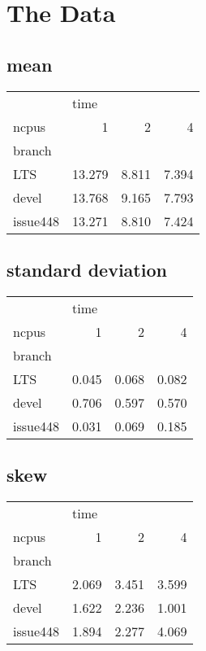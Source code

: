 \chapter{The Data}
\section{mean}
\begin{tabular}{lrrr}
\toprule
{} & \multicolumn{3}{l}{time} \\
ncpus &       1 &      2 &      4 \\
branch   &         &        &        \\
\midrule
LTS      &  13.279 &  8.811 &  7.394 \\
devel    &  13.768 &  9.165 &  7.793 \\
issue448 &  13.271 &  8.810 &  7.424 \\
\bottomrule
\end{tabular}
\section{standard deviation}
\begin{tabular}{lrrr}
\toprule
{} & \multicolumn{3}{l}{time} \\
ncpus &      1 &      2 &      4 \\
branch   &        &        &        \\
\midrule
LTS      &  0.045 &  0.068 &  0.082 \\
devel    &  0.706 &  0.597 &  0.570 \\
issue448 &  0.031 &  0.069 &  0.185 \\
\bottomrule
\end{tabular}
\section{skew}
\begin{tabular}{lrrr}
\toprule
{} & \multicolumn{3}{l}{time} \\
ncpus &      1 &      2 &      4 \\
branch   &        &        &        \\
\midrule
LTS      &  2.069 &  3.451 &  3.599 \\
devel    &  1.622 &  2.236 &  1.001 \\
issue448 &  1.894 &  2.277 &  4.069 \\
\bottomrule
\end{tabular}
